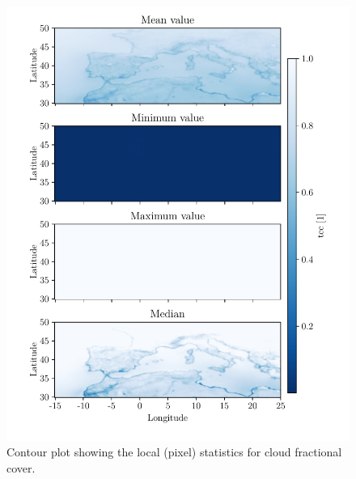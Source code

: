 \begin{figure}[ht]
    \centering
    \includegraphics{python_figs/all_stat_variable_tcc.pdf}
    \caption{Contour plot showing the local (pixel) statistics for cloud fractional cover.}
    \label{fig:all_stats_tcc}
\end{figure}

